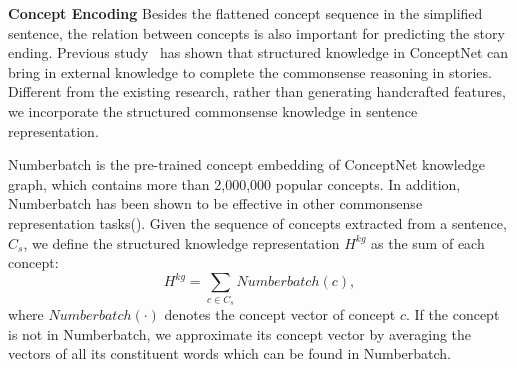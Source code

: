 






\textbf{Concept Encoding}
Besides the flattened concept sequence in the simplified sentence, 
the relation between concepts is also important for 
predicting the story ending. 
Previous study~\cite{chen2018incorporating,guan2018story} 
has shown that structured knowledge in ConceptNet can bring in external 
knowledge to complete the commonsense reasoning in stories.
Different from the existing research,
rather than generating handcrafted features,
we incorporate the structured commonsense knowledge
in sentence representation. 

Numberbatch
is the pre-trained concept embedding of ConceptNet knowledge graph,
which contains more than 2,000,000 popular concepts. In addition, 
Numberbatch has been shown to be effective in other 
commonsense representation tasks(\citeauthor{speer2017conceptnet_2}). 
Given the sequence of concepts extracted from a sentence, $C_s$,
we define the structured knowledge representation $H^{kg}$
as the sum of each concept:
\begin{equation}
  H^{kg} = \sum_{c \in C_s}{Numberbatch(c)},
\end{equation}
\noindent
where $Numberbatch(\cdot)$ denotes the concept vector of concept $c$.
If the concept is not in Numberbatch, we approximate its concept vector
by averaging the vectors of all its constituent words which can be found 
in Numberbatch.


